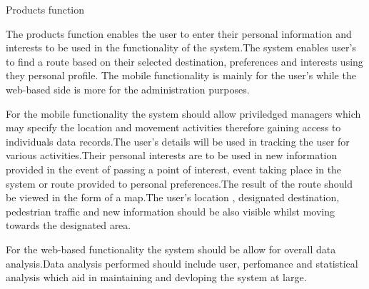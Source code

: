 Products function
\par
\bigskip
\noindent
The products function enables the user to enter their personal information and interests to be used in the functionality of the system.The system enables user's to find a route based on their selected destination, preferences and interests using they personal profile.
The mobile functionality is mainly for the user's while the web-based side is more for the administration purposes.
\par
\bigskip
\noindent
For the mobile functionality the system should allow priviledged managers which may specify the location and movement activities therefore gaining access to individuals data records.The user's details will be used in tracking the user for various activities.Their personal interests are to be used in new information provided in the event of passing a point of interest, event taking place in the system or route provided to personal preferences.The result of the route should be viewed in the form of a map.The user's location , designated destination,  pedestrian traffic and new information should be also visible whilst moving towards the designated area.
\par
\bigskip
\noindent
For the web-based functionality the system should be allow for overall data analysis.Data analysis performed should include user, perfomance and statistical analysis which aid in maintaining and devloping the system at large.
